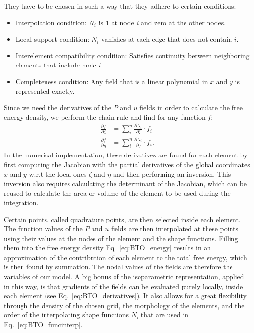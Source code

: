 They have to be chosen in such a way that they adhere to certain conditions:
\begin{itemize}
	\item Interpolation condition: $N_i$ is 1 at node $i$ and zero at the other nodes.
	\item Local support condition: $N_i$ vanishes at each edge that does not contain $i$.
	\item Interelement compatibility condition: Satisfies continuity between neighboring elements that include node $i$.
	\item Completeness condition: Any field that is a linear polynomial in $x$ and $y$ is represented exactly.
\end{itemize}

Since we need the derivatives of the $P$ and $u$ fields in order to calculate the free energy density, we perform the chain rule and find for any function $f$:
\begin{align}
	\label{eq:BTO_derivatives}
	\frac{\partial f}{\partial \zeta} &= \sum_i^n \frac{\partial N_i}{\partial \zeta} \cdot f_i \\
	\frac{\partial f}{\partial \eta}  &= \sum_i^n \frac{\partial N_i}{\partial \eta} \cdot f_i\nonumber.
\end{align}
In the numerical implementation, these derivatives are found for each element by first computing the Jacobian with the partial derivatives of the global coordinates $x$ and $y$ w.r.t the local ones $\zeta$ and $\eta$ and then performing an inversion.
This inversion also requires calculating the determinant of the Jacobian, which can be reused to calculate the area or volume of the element to be used during the integration.

Certain points, called quadrature points, are then selected inside each element.
The function values of the $P$ and $u$ fields are then interpolated at these points using their values at the nodes of the element and the shape functions.
Filling them into the free energy density Eq.~\eqref{eq:BTO_energy} results in an approximation of the contribution of each element to the total free energy, which is then found by summation. 
The nodal values of the fields are therefore the variables of our model. 
A big bonus of the isoparametric representation, applied in this way, is that gradients of the fields can be evaluated purely locally, inside each element (see Eq.~\eqref{eq:BTO_derivatives}).
It also allows for a great flexibility through the density of the chosen grid, the morphology of the elements, and the order of the interpolating shape functions $N_i$ that are used in Eq.~\eqref{eq:BTO_funcinterp}.

